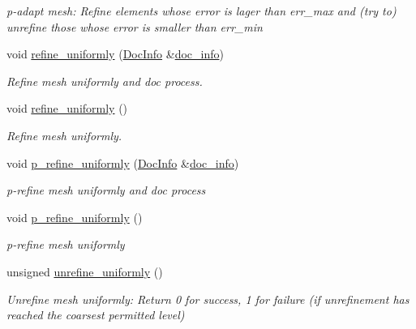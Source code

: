 \begin{DoxyCompactItemize}
\begin{DoxyCompactList}\small\item\em p-\/adapt mesh\+: Refine elements whose error is lager than err\+\_\+max and (try to) unrefine those whose error is smaller than err\+\_\+min \end{DoxyCompactList}\item 
void \hyperlink{classoomph_1_1TreeBasedRefineableMeshBase_ae238476195a0ceeb2cdb680620fb97a3}{refine\+\_\+uniformly} (\hyperlink{classoomph_1_1DocInfo}{Doc\+Info} \&\hyperlink{classoomph_1_1RefineableMeshBase_a266f8b2a1499cc2ae7b24b19813923ee}{doc\+\_\+info})
\begin{DoxyCompactList}\small\item\em Refine mesh uniformly and doc process. \end{DoxyCompactList}\item 
void \hyperlink{classoomph_1_1TreeBasedRefineableMeshBase_a8e67b50fecb03fe1ac93dcb81e4ac6e9}{refine\+\_\+uniformly} ()
\begin{DoxyCompactList}\small\item\em Refine mesh uniformly. \end{DoxyCompactList}\item 
void \hyperlink{classoomph_1_1TreeBasedRefineableMeshBase_a270d74e0e30f9956c85e4cdcc202c98b}{p\+\_\+refine\+\_\+uniformly} (\hyperlink{classoomph_1_1DocInfo}{Doc\+Info} \&\hyperlink{classoomph_1_1RefineableMeshBase_a266f8b2a1499cc2ae7b24b19813923ee}{doc\+\_\+info})
\begin{DoxyCompactList}\small\item\em p-\/refine mesh uniformly and doc process \end{DoxyCompactList}\item 
void \hyperlink{classoomph_1_1TreeBasedRefineableMeshBase_ae922698aeb358f174c37dac5101c5369}{p\+\_\+refine\+\_\+uniformly} ()
\begin{DoxyCompactList}\small\item\em p-\/refine mesh uniformly \end{DoxyCompactList}\item 
unsigned \hyperlink{classoomph_1_1TreeBasedRefineableMeshBase_a52940028ba9f6472df7e7c65be265057}{unrefine\+\_\+uniformly} ()
\begin{DoxyCompactList}\small\item\em Unrefine mesh uniformly\+: Return 0 for success, 1 for failure (if unrefinement has reached the coarsest permitted level) \end{DoxyCompactList}\item 

\end{DoxyCompactItemize}
